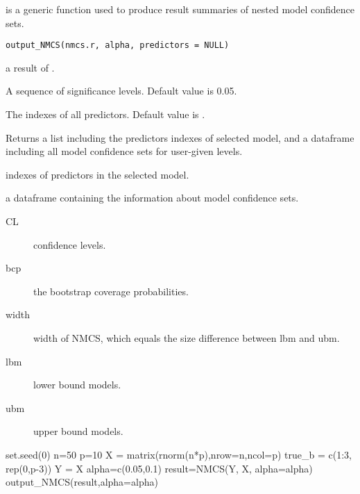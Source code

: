 \documentclass[a4paper]{book}
\begin{document}
%
\begin{Description}\relax
{} is a generic function used to produce result summaries of nested model confidence sets.
\end{Description}
%
\begin{Usage}
\begin{verbatim}
output_NMCS(nmcs.r, alpha, predictors = NULL)
\end{verbatim}
\end{Usage}
%
\begin{Arguments}
\begin{ldescription}
\item[\code{nmcs.r}] a result of .

\item[\code{alpha}] A sequence of significance levels. Default value is 0.05.

\item[\code{predictors}] The indexes of all predictors. Default value is .
\end{ldescription}
\end{Arguments}
%
\begin{Value}
Returns a list including the predictors indexes of selected model, and a
dataframe including all model confidence sets for user-given  levels.
\begin{ldescription}
\item[\code{hat\_M}] indexes of predictors in the selected model.
\item[\code{MCS.frame}] a dataframe containing the information about model confidence sets.
\begin{description}

\item[CL] confidence levels.
\item[bcp] the bootstrap coverage probabilities.
\item[width] width of NMCS, which equals the size difference between lbm and ubm.
\item[lbm] lower bound models.
\item[ubm] upper bound models.

\end{description}


\end{ldescription}
\end{Value}
%
\begin{Examples}
\begin{ExampleCode}
set.seed(0)
n=50
p=10
X = matrix(rnorm(n*p),nrow=n,ncol=p)
true_b = c(1:3, rep(0,p-3))
Y = X %
alpha=c(0.05,0.1)
result=NMCS(Y, X, alpha=alpha)
output_NMCS(result,alpha=alpha)
\end{ExampleCode}
\end{Examples}
\printindex{}
\end{document}
